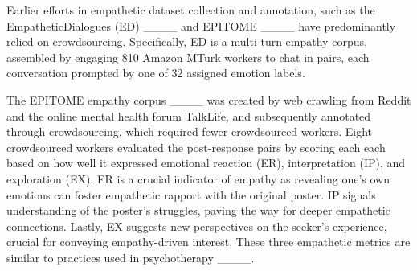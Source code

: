 Earlier efforts in empathetic dataset collection and annotation, such as the EmpatheticDialogues (ED) ____ and EPITOME ____ have predominantly relied on crowdsourcing. Specifically, ED is a multi-turn empathy corpus, assembled by engaging 810 Amazon MTurk workers to chat in pairs, each conversation prompted by one of 32 assigned emotion labels. 

The EPITOME empathy corpus ____ was created by web crawling from Reddit and the online mental health forum TalkLife, and subsequently annotated through crowdsourcing, which required fewer crowdsourced workers. Eight crowdsourced workers evaluated the post-response pairs by scoring each each based on how well it expressed emotional reaction (ER), interpretation (IP), and exploration (EX).
ER is a crucial indicator of empathy as revealing one's own emotions can foster empathetic rapport with the original poster. IP signals understanding of the poster's struggles, paving the way for deeper empathetic connections. Lastly, EX suggests new perspectives on the seeker’s experience, crucial for conveying empathy-driven interest.
These three empathetic metrics are similar to practices used in psychotherapy ____.

